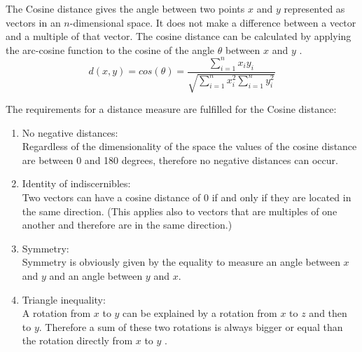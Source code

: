 The Cosine distance gives the angle between two points $x$ and $y$ represented as vectors in an $n$-dimensional space. It does not make a difference between a vector and a multiple of that vector. The cosine distance can be calculated by applying the arc-cosine function to the cosine of the angle $\theta$ between $x$ and $y$ \cite{MMDS}. \\

$$ d(x,y) = cos(\theta) = \frac{\sum_{i=1}^{n} x_i y_i}{\sqrt{\sum_{i=1}^{n} x_i^2 \sum_{i=1}^{n} y_i^2}} $$

The requirements for a distance measure are fulfilled for the Cosine distance:
\begin{enumerate}
	\item No negative distances:\\
	Regardless of the dimensionality of the space the values of the cosine distance are between 0 and 180 degrees, therefore no negative distances can occur. 
	\item Identity of indiscernibles:\\
	Two vectors can have a cosine distance of 0 if and only if they are located in the same direction. (This applies also to vectors that are multiples of one another and therefore are in the same direction.) 
	\item Symmetry: \\
	Symmetry is obviously given by the equality to measure an angle between $x$ and $y$ and an angle between $y$ and $x$. 
	\item Triangle inequality: \\
	A rotation from $x$ to $y$ can be explained by a rotation from $x$ to $z$ and then to $y$. Therefore a sum of these two rotations is always bigger or equal than the rotation directly from $x$ to $y$ \cite{MMDS}. 
\end{enumerate}